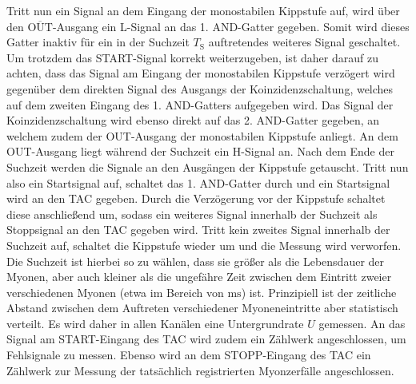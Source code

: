 Tritt nun ein Signal an dem Eingang der monostabilen Kippstufe auf, wird über den $\overline{\text{OUT}}$-Ausgang ein L-Signal an das 1. AND-Gatter gegeben. Somit wird dieses Gatter inaktiv für ein in der Suchzeit $T_{\mathrm{S}}$ auftretendes weiteres Signal geschaltet. Um trotzdem das START-Signal korrekt weiterzugeben, ist daher darauf zu achten, dass das Signal am Eingang der monostabilen Kippstufe verzögert wird gegenüber dem direkten Signal des Ausgangs der Koinzidenzschaltung, welches auf dem zweiten Eingang des 1. AND-Gatters aufgegeben wird.
Das Signal der Koinzidenzschaltung wird ebenso direkt auf das 2. AND-Gatter gegeben, an welchem zudem der OUT-Ausgang der monostabilen Kippstufe anliegt. An dem OUT-Ausgang liegt während der Suchzeit ein H-Signal an.
Nach dem Ende der Suchzeit werden die Signale an den Ausgängen der Kippstufe getauscht.
Tritt nun also ein Startsignal auf, schaltet das 1. AND-Gatter durch und ein Startsignal wird an den TAC gegeben. Durch die Verzögerung vor der Kippstufe schaltet diese anschließend um, sodass ein weiteres Signal innerhalb der Suchzeit als Stoppsignal an den TAC gegeben wird.
Tritt kein zweites Signal innerhalb der Suchzeit auf, schaltet die Kippstufe wieder um und die Messung wird verworfen.
Die Suchzeit ist hierbei so zu wählen, dass sie größer als die Lebensdauer der Myonen, aber auch kleiner als die ungefähre Zeit zwischen dem Eintritt zweier verschiedenen Myonen (etwa im Bereich von $\si{\milli\second}$) ist.
Prinzipiell ist der zeitliche Abstand zwischen dem Auftreten verschiedener Myoneneintritte aber statistisch verteilt. Es wird daher in allen Kanälen eine Untergrundrate $U$ gemessen.
An das Signal am START-Eingang des TAC wird zudem ein Zählwerk angeschlossen, um Fehlsignale zu messen.
Ebenso wird an dem STOPP-Eingang des TAC ein Zählwerk zur Messung der tatsächlich registrierten Myonzerfälle angeschlossen.
